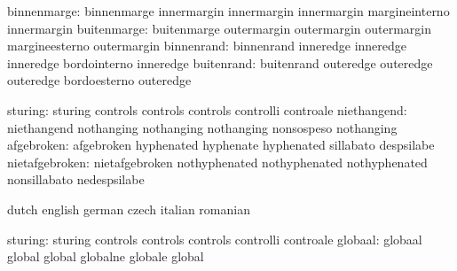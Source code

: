 
              binnenmarge: binnenmarge               innermargin
                           innermargin               innermargin
                           margineinterno            innermargin
              buitenmarge: buitenmarge               outermargin
                           outermargin               outermargin
                           margineesterno            outermargin
               binnenrand: binnenrand                inneredge
                           inneredge                 inneredge
                           bordointerno              inneredge
               buitenrand: buitenrand                outeredge
                           outeredge                 outeredge
                           bordoesterno              outeredge

                  sturing: sturing                   controls
                           controls                  controls
                           controlli                 controale
              niethangend: niethangend               nothanging
                           nothanging                nothanging
                           nonsospeso                nothanging
               afgebroken: afgebroken                hyphenated
                           hyphenate                 hyphenated
                           sillabato                 despsilabe
           nietafgebroken: nietafgebroken            nothyphenated
                           nothyphenated             nothyphenated
                           nonsillabato              nedespsilabe

\stopvariables

\startconstants            dutch                     english
                           german                    czech
                           italian                   romanian

                  sturing: sturing                   controls
                           controls                  controls
                           controlli                  controale
                  globaal: globaal                   global
                           global                    globalne
                           globale                   global

\stopconstants




